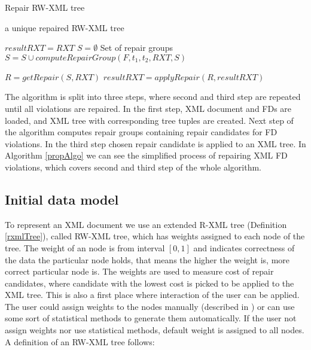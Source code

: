 \begin{algorithm}
\caption{Repair RW-XML tree}
\label{propAlgo}
\begin{algorithmic}[1]
\ENSURE a unique repaired RW-XML tree

\STATE $resultRXT = RXT$
    \STATE $S = \emptyset$ \COMMENT Set of repair groups
		    \STATE $S = S \cup computeRepairGroup(F, t_1, t_2, RXT, S)$
	    \ENDFOR
    \ENDFOR

    \STATE $R = getRepair(S, RXT)$
    \STATE $resultRXT = applyRepair(R, resultRXT)$
\ENDWHILE

\end{algorithmic}
\end{algorithm}

The algorithm is split into three steps, where second and third step are repeated until all violations are repaired. In the first step, XML document and FDs are loaded, and XML tree with corresponding tree tuples are created. Next step of the algorithm computes repair groups containing repair candidates for FD violations. In the third step chosen repair candidate is applied to an XML tree. In Algorithm \ref{propAlgo} we can see the simplified process of repairing XML FD violations, which covers second and third step of the whole algorithm.

\subsection{Initial data model}

To represent an XML document we use an extended R-XML tree (Definition \ref{rxmlTree}), called RW-XML tree, which has weights assigned to each node of the tree. The weight of an node is from interval $[0,1]$ and indicates correctness of the data the particular node holds, that means the higher the weight is, more correct particular node is. The weights are used to measure cost of repair candidates, where candidate with the lowest cost is picked to be applied to the XML tree. This is also a first place where interaction of the user can be applied. The user could assign weights to the nodes manually (described in ) or can use some sort of statistical methods to generate them automatically. If the user not assign weights nor use statistical methods, default weight is assigned to all nodes. A definition of an RW-XML tree follows:

